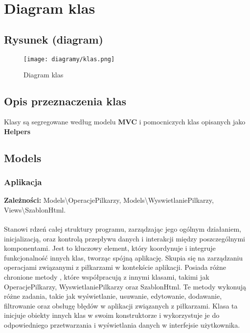 \section{Diagram klas}
\subsection{Rysunek (diagram)}
\begin{figure}[!htb]
    \centering
    \texttt{[image: diagramy/klas.png]}
    \caption{Diagram klas}                
\end{figure}

\subsection{Opis przeznaczenia klas}
    Klasy są segregowane według modelu \textbf{MVC} i pomocniczych klas opisanych jako \textbf{Helpers}

\subsection{Models}
    \subsubsection{Aplikacja}

    \textbf{Zależności: } 
    Models\textbackslash{}OperacjePilkarzy, 
    Models\textbackslash{}WyswietlaniePilkarzy, 
    Views\textbackslash{}SzablonHtml.\\\\
    
    Stanowi rdzeń całej struktury programu, zarządzając jego ogólnym działaniem, inicjalizacją, oraz kontrolą przepływu danych i interakcji między poszczególnymi komponentami. Jest to kluczowy element, który koordynuje i integruje funkcjonalność innych klas, tworząc spójną aplikację.
    Skupia się na zarządzaniu operacjami związanymi z piłkarzami w kontekście aplikacji. Posiada różne chronione metody , które współpracują z innymi klasami, takimi jak OperacjePilkarzy, WyswietlaniePilkarzy oraz SzablonHtml. Te metody wykonują różne zadania, takie jak wyświetlanie, usuwanie, edytowanie, dodawanie, filtrowanie oraz obsługę błędów w aplikacji związanych z piłkarzami. Klasa ta inicjuje obiekty innych klas w swoim konstruktorze i wykorzystuje je do odpowiedniego przetwarzania i wyświetlania danych w interfejsie użytkownika.\\

